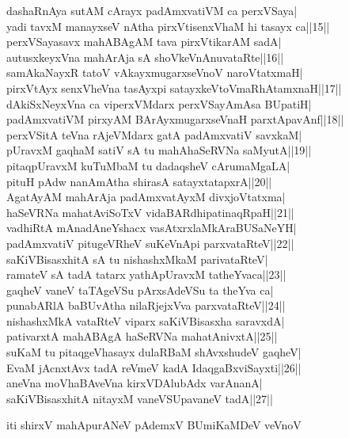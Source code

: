\documentclass{article}
\begin{document}
dashaRnAya sutAM cArayx padAmxvatiVM ca perxVSaya|\\
yadi tavxM manayxseV nAtha pirxVtisenxVhaM hi tasayx ca||15||\\
perxVSayasavx mahABAgAM tava pirxVtikarAM sadA|\\
autusxkeyxVna mahArAja sA shoVkeVnAnuvataRte||16||\\
samAkaNayxR tatoV vAkayxmugarxseVnoV naroVtatxmaH|\\
pirxVtAyx senxVheVna tasAyxpi satayxkeVtoVmaRhAtamxnaH||17||\\
dAkiSxNeyxVna ca viperxVMdarx perxVSayAmAsa BUpatiH|\\
padAmxvatiVM pirxyAM BArAyxmugarxseVnaH parxtApavAnf||18||\\
perxVSitA teVna rAjeVMdarx gatA padAmxvatiV savxkaM|\\
pUravxM gaqhaM satiV sA tu mahAhaSeRVNa saMyutA||19||\\
pitaqpUravxM kuTuMbaM tu dadaqsheV cArumaMgaLA|\\
pituH pAdw nanAmAtha shirasA satayxtatapxrA||20||\\
AgatAyAM mahArAja padAmxvatAyxM divxjoVtatxma|\\
haSeVRNa mahatAviSoTxV vidaBARdhipatinaqRpaH||21||\\
vadhiRtA mAnadAneYshacx vasAtxrxlaMkAraBUSaNeYH|\\
padAmxvatiV pitugeVRheV suKeVnApi parxvataRteV||22||\\
saKiVBisasxhitA sA tu nishashxMkaM parivataRteV|\\
ramateV sA tadA tatarx yathApUravxM tatheYvaca||23||\\
gaqheV vaneV taTAgeVSu pArxsAdeVSu ta theYva ca|\\
punabARlA baBUvAtha nilaRjejxVva parxvataRteV||24||\\
nishashxMkA vataRteV viparx saKiVBisasxha saravxdA|\\
pativarxtA mahABAgA haSeRVNa mahatAnivxtA||25||\\
suKaM tu pitaqgeVhasayx dulaRBaM shAvxshudeV gaqheV|\\
EvaM jAcnxtAvx tadA reVmeV kadA IdaqgaBxviSayxti||26||\\
aneVna moVhaBAveVna kirxVDAlubAdx varAnanA|\\
saKiVBisasxhitA nitayxM vaneVSUpavaneV tadA||27||

\begin{center}
iti shirxV mahApurANeV pAdemxV BUmiKaMDeV veVnoV
\end{center}
\end{document}
